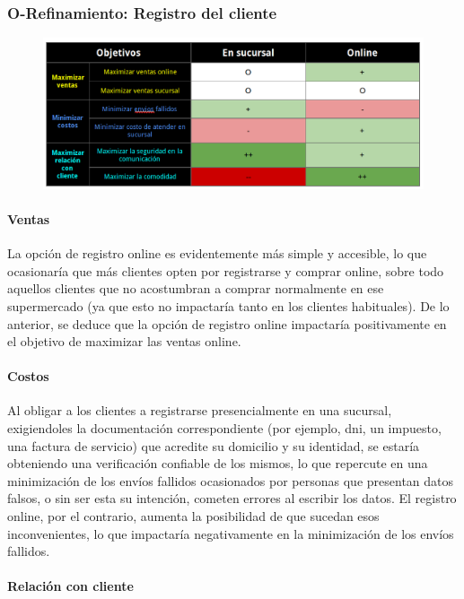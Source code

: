 \newpage
\subsubsection{O-Refinamiento: Registro del cliente}
\begin{figure}[H]
  \includegraphics[width=\linewidth]{images/objetivo-blando-registro-cliente.png}
\end{figure}

\paragraph{Ventas}

La opción de registro online es evidentemente más simple y accesible, lo que
ocasionaría que más clientes opten por registrarse y comprar online, sobre todo
aquellos clientes que no acostumbran a comprar normalmente en ese supermercado
(ya que esto no impactaría tanto en los clientes habituales). De lo anterior, se
deduce que la opción de registro online impactaría positivamente en el objetivo
de maximizar las ventas online.

\paragraph{Costos}

Al obligar a los clientes a registrarse presencialmente en una sucursal,
exigiendoles la documentación correspondiente (por ejemplo, dni, un impuesto,
una factura de servicio) que acredite su domicilio y su identidad, se estaría
obteniendo una verificación confiable de los mismos, lo que repercute en una
minimización de los envíos fallidos ocasionados por personas que presentan datos
falsos, o sin ser esta su intención, cometen errores al escribir los datos. El
registro online, por el contrario, aumenta la posibilidad de que sucedan esos
inconvenientes, lo que impactaría negativamente en la minimización de los envíos
fallidos.

\paragraph{Relación con cliente}

